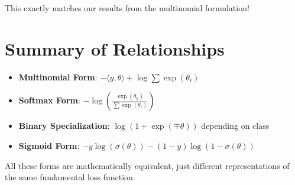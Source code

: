 \begin{notechapter}
This exactly matches our results from the multinomial formulation!

\section{Summary of Relationships}

\begin{itemize}
    \item \textbf{Multinomial Form}: $-\langle y, \theta\rangle + \log\sum \exp(\theta_i)$
    \item \textbf{Softmax Form}: $-\log\left(\frac{\exp(\theta_y)}{\sum \exp(\theta_i)}\right)$
    \item \textbf{Binary Specialization}: $\log(1 + \exp(\mp\theta))$ depending on class
    \item \textbf{Sigmoid Form}: $-y\log(\sigma(\theta)) - (1-y)\log(1-\sigma(\theta))$
\end{itemize}

All these forms are mathematically equivalent, just different representations of the same fundamental loss function.
\end{notechapter}
